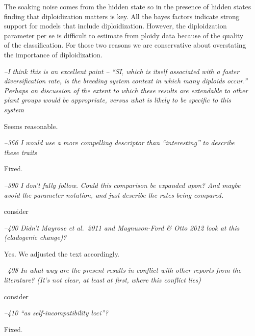 \documentclass[11pt]{article}
\renewenvironment{quote}{\bigskip\noindent\itshape\ignorespaces}{\smallskip}
\begin{document}
The soaking noise comes from the hidden state so in the presence of hidden states finding that diploidization matters is key. All the bayes factors indicate strong support for models that include diploidization. However, the diploidzation parameter per se is difficult to estimate from ploidy data because of the quality of the classification. For those two reasons we are conservative about overstating the importance of diploidization.

\begin{quote}
--I think this is an excellent point -- ``SI, which is itself associated with a faster diversification rate, is the breeding system context in which many diploids occur.''
Perhaps an discussion of the extent to which these results are extendable to other plant groups would be appropriate, versus what is likely to be specific to this system
\end{quote}

Seems reasonable. %

\begin{quote}
--366  I would use a more compelling descriptor than ``interesting'' to describe these traits
\end{quote}

Fixed.

\begin{quote}
--390  I don't fully follow.
Could this comparison be expanded upon?
And maybe avoid the parameter notation, and just describe the rates being compared.
\end{quote}

consider %

\begin{quote}
--400  Didn't Mayrose et al.\ 2011 and Magnuson-Ford \& Otto 2012 look at this (cladogenic change)?
\end{quote}

Yes. We adjusted the text accordingly.

\begin{quote}
--408  In what way are the present results in conflict with other reports from the literature?
(It's not clear, at least at first, where this conflict lies)
\end{quote}

consider %

\begin{quote}
--410  ``as self-incompatibility loci''?
\end{quote}

Fixed.
\end{document}
